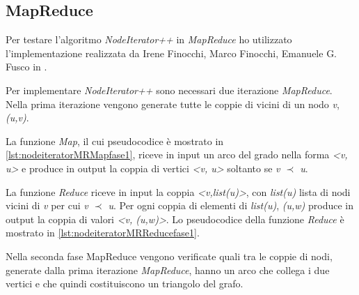 \documentclass[LaM,binding=0.6cm]{sapthesis}
\begin{document}
\begin{minipage}{\linewidth}
	
\end{minipage}


\subsection{MapReduce}

Per testare l'algoritmo \textit{NodeIterator++} in \textit{MapReduce} ho utilizzato l'implementazione realizzata da Irene Finocchi, Marco Finocchi, Emanuele G. Fusco in \cite{DBLP:journals/corr/FinocchiFF14}.

Per implementare \textit{NodeIterator++ } sono necessari due iterazione \textit{MapReduce}. Nella prima iterazione vengono generate tutte le coppie di vicini di un nodo \textit{v}, \textit{(u,v)}.

La funzione \textit{Map}, il cui pseudocodice è mostrato in \ref{lst:nodeiteratorMRMapfase1}, riceve in input un arco del grado nella forma \textit{<v, u>} e produce in output la coppia di vertici \textit{<v, u>} soltanto se \textit{v $\prec$ u}.

La funzione \textit{Reduce} riceve in input la coppia \textit{<v,list(u)>}, con \textit{list(u)} lista di nodi vicini di \textit{v} per cui \textit{v $\prec$ u}. Per ogni coppia di elementi  di \textit{list(u)}, \textit{(u,w)} produce in output la coppia di valori \textit{<v, (u,w)>}. Lo pseudocodice della funzione \textit{Reduce} è mostrato in \ref{lst:nodeiteratorMRReducefase1}.

\begin{minipage}{\linewidth}	
	
\end{minipage}

\begin{minipage}{\linewidth}
	
\end{minipage}

Nella seconda fase MapReduce vengono verificate quali tra le coppie di nodi, generate dalla prima iterazione \textit{MapReduce}, hanno un arco che collega i due vertici e che quindi costituiscono un triangolo del grafo. 
\end{document}
